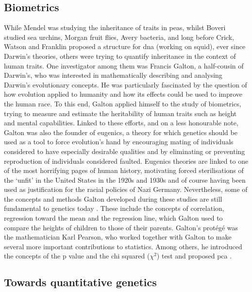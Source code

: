 \subsection{Biometrics} %
\label{sec:biometrics}

While Mendel was studying the inheritance of traits in peas, whilst Boveri studied sea urchins, Morgan fruit flies, Avery bacteria, and long before Crick, Watson and Franklin proposed a structure for \gls{dna} (working on squid), ever since Darwin’s theories, others were trying to quantify inheritance in the context of human traits.
One investigator among them was Francis Galton, a half-cousin of Darwin’s, who was interested in mathematically describing and analysing Darwin’s evolutionary concepts. 
He was particularly fascinated by the question of how evolution applied to humanity and how its effects could be used to improve the human race. 
To this end, Galton applied himself to the study of biometrics, trying to measure and estimate the heritability of human traits such as height and mental capabilities. 
Linked to these efforts, and on a less honourable note, Galton was also the founder of eugenics, a theory for which genetics should be used as a tool to force evolution’s hand by encouraging mating of individuals considered to have especially desirable qualities and by eliminating or preventing reproduction of individuals considered faulted. Eugenics theories are linked to one of the most horrifying pages of human history, motivating forced sterilisations of the `unfit' in the United States in the 1920s and 1930s and of course having been used as justification for the racial policies of Nazi Germany.
Nevertheless, some of the concepts and methods Galton developed during these studies are still fundamental to genetics today \cite{galton1870hereditary}. 
These include the concepts of correlation, regression toward the mean and the regression line, which Galton used to compare the heights of children to those of their parents. 
Galton’s protégé was the mathematician Karl Pearson, who worked together with Galton to make several more important contributions to statistics. 
Among others, he introduced the concepts of the p value and the chi squared ($\chi^2$) test \cite{pearson1900x} and proposed \gls{pca} \cite{pearson1901liii}.

\subsection{Towards quantitative genetics} %
\label{sec:Fisher}

